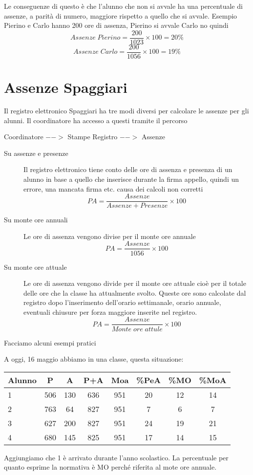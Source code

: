 \documentclass{article}
\begin{document}
Le conseguenze di questo è che l'alunno che non si avvale ha una percentuale di assenze, a parità di numero, maggiore rispetto a quello che si avvale. Esempio Pierino e Carlo hanno 200 ore di assenza, Pierino si avvale Carlo no quindi
\[Assenze\; Pierino=\dfrac{200}{1023}\times 100=20\%\]
\[Assenze\; Carlo=\dfrac{200}{1056}\times 100=19\%\]

\section*{Assenze Spaggiari}
Il registro elettronico Spaggiari  ha tre modi diversi per calcolare le assenze per gli alunni. Il coordinatore ha accesso a questi tramite il percorso

Coordinatore $-->$ Stampe Registro $-->$ Assenze 
\begin{description}
	\item[Su assenze e presenze] Il registro elettronico tiene conto delle ore di assenza e presenza di un alunno  in base a quello che inserisce durante la firma appello, quindi un errore, una mancata firma etc. causa dei  calcoli non corretti \[PA=\dfrac{Assenze}{Assenze+Presenze}\times 100\]
	\item[Su monte ore annuali] Le ore di assenza vengono divise per il monte ore annuale \[PA=\dfrac{Assenze}{1056}\times 100\]
	\item[Su monte ore attuale] Le ore di assenza vengono divide per il monte ore attuale cioè per il totale delle ore che la classe ha attualmente svolto. Queste ore sono calcolate dal registro dopo l'inserimento dell'orario settimanale, orario annuale, eventuali chiusure per forza maggiore inserite nel registro.   \[PA=\dfrac{Assenze}{Monte\; ore\; attule}\times 100\]
\end{description}
Facciamo alcuni esempi pratici

A oggi, 16 maggio abbiamo in una classe, questa situazione:

\begin{center}
	\begin{tabular}{|l|c|c|c|c|c|c|c|}
	\hline
Alunno	& P & A &  P+A &Moa & \%PeA & \%MO & \%MoA   \\
	\hline
1	& 506 & 130& 636 & 951 & 20 & 12 & 14   \\
	\hline
2	&763  &64&827  & 951 &7  & 6 &  7  \\
	\hline
3	&627  &200&827  & 951 &24  & 19 &  21  \\
	\hline
4	&680  &145&825  & 951 &17  & 14 &  15  \\
\hline
\end{tabular} 
\end{center}
Aggiungiamo che 1 è arrivato durante l'anno scolastico. La percentuale per quanto esprime la normativa è MO perché riferita al mote ore annuale.
\nocite{*}
\printbibliography
\end{document}
